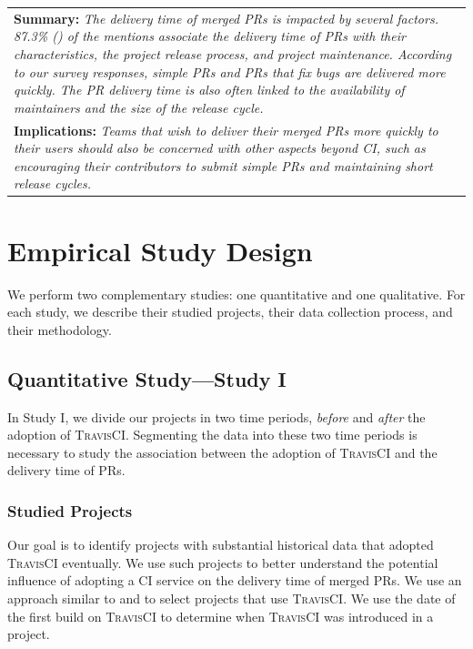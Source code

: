 \begin{center}
	\begin{tabular}{|p{}|}
		\hline
		\textbf{Summary:}
		\textit{The delivery time of merged PRs is impacted by several factors. 87.3\% (\nicefrac{579}{663}) of the mentions associate the delivery time of PRs with their characteristics, the project release process, and project maintenance. According to our survey responses, simple PRs and PRs that fix bugs are delivered more quickly. The PR delivery time is also often linked to the availability of maintainers and the size of the release cycle.} \\
		\textbf{Implications:}
		\textit{Teams that wish to deliver their merged PRs more quickly to their users should also be concerned with other aspects beyond CI, such as encouraging their contributors to submit simple PRs and maintaining short release cycles.}
		\\
		\hline
	\end{tabular}
\end{center}
\section{Empirical Study Design}
\label{sec_empirical_study}

We perform two complementary studies: one quantitative and one qualitative. For each study, we describe their studied projects, their data collection process, and their methodology.

\subsection{\textbf{Quantitative Study---Study I}}
\label{sec_quantitative_study}

In Study I, we divide our projects in two time periods, \textit{before} and \textit{after} the adoption of \textsc{TravisCI}. Segmenting the data into these two time periods is necessary to study the association between the adoption of \textsc{TravisCI} and the delivery time of PRs.

\subsubsection{Studied Projects}
\label{subsec_quant_studided_projects}

Our goal is to identify projects with substantial historical data that adopted \textsc{TravisCI} eventually. We use such projects to better understand the potential influence of adopting a CI service on the delivery time of merged PRs. We use an approach similar to \cite{Vasilescu2015-tn} and \cite{Hilton2016-xy} to select projects that use \textsc{TravisCI}. We use the date of the first build on \textsc{TravisCI} to determine when \textsc{TravisCI} was introduced in a project. 

